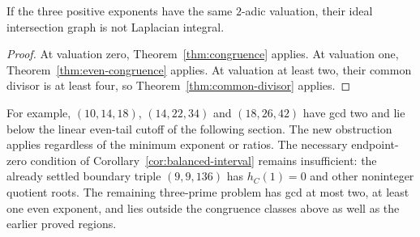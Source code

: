 \begin{corollary}
\label{cor:common-valuation}
If the three positive exponents have the same $2$-adic valuation, their
ideal intersection graph is not Laplacian integral.
\end{corollary}

\begin{proof}
At valuation zero, Theorem~\ref{thm:congruence} applies. At valuation
one, Theorem~\ref{thm:even-congruence} applies. At valuation at least
two, their common divisor is at least four, so
Theorem~\ref{thm:common-divisor} applies.
\end{proof}

For example, $(10,14,18)$, $(14,22,34)$ and $(18,26,42)$ have gcd two
and lie below the linear even-tail cutoff of the following section.
The new obstruction applies regardless of the minimum exponent or ratios.
The necessary endpoint-zero condition of
Corollary~\ref{cor:balanced-interval} remains insufficient: the already
settled boundary triple $(9,9,136)$ has $h_C(1)=0$ and other noninteger
quotient roots. The remaining three-prime problem has gcd at most two,
at least one even exponent, and lies outside the congruence classes
above as well as the earlier proved regions.

